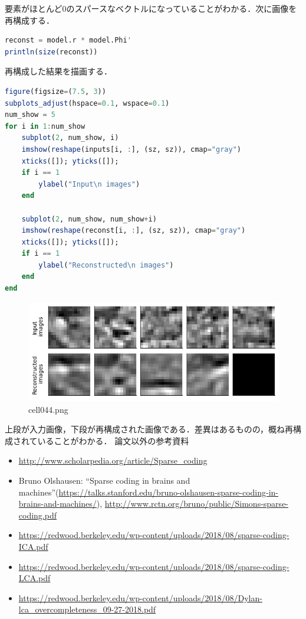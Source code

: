 要素がほとんど0のスパースなベクトルになっていることがわかる．次に画像を再構成する．
\begin{lstlisting}[language=julia]
reconst = model.r * model.Phi'
println(size(reconst))
\end{lstlisting}
再構成した結果を描画する．
\begin{lstlisting}[language=julia]
figure(figsize=(7.5, 3))
subplots_adjust(hspace=0.1, wspace=0.1)
num_show = 5
for i in 1:num_show
    subplot(2, num_show, i)
    imshow(reshape(inputs[i, :], (sz, sz)), cmap="gray")
    xticks([]); yticks([]); 
    if i == 1
        ylabel("Input\n images")
    end

    subplot(2, num_show, num_show+i)
    imshow(reshape(reconst[i, :], (sz, sz)), cmap="gray")
    xticks([]); yticks([]); 
    if i == 1
        ylabel("Reconstructed\n images")
    end
end
\end{lstlisting}
\begin{figure}[ht]
	\centering
	\includegraphics[scale=0.8, max width=\linewidth]{./fig/energy-based-model/sparse-coding/cell044.png}
	\caption{cell044.png}
	\label{cell044.png}
\end{figure}
上段が入力画像，下段が再構成された画像である．差異はあるものの，概ね再構成されていることがわかる．
論文以外の参考資料
\begin{itemize}
\item \url{http://www.scholarpedia.org/article/Sparse_coding}
\item Bruno Olshausen: “Sparse coding in brains and machines”(\url{https://talks.stanford.edu/bruno-olshausen-sparse-coding-in-brains-and-machines/}), \url{http://www.rctn.org/bruno/public/Simons-sparse-coding.pdf}
\item \url{https://redwood.berkeley.edu/wp-content/uploads/2018/08/sparse-coding-ICA.pdf}
\item \url{https://redwood.berkeley.edu/wp-content/uploads/2018/08/sparse-coding-LCA.pdf}
\item \url{https://redwood.berkeley.edu/wp-content/uploads/2018/08/Dylan-lca_overcompleteness_09-27-2018.pdf}
\end{itemize}
